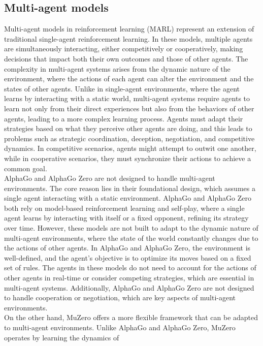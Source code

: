 \subsection*{Multi-agent models}
Multi-agent models in reinforcement learning (MARL) represent an extension of traditional single-agent reinforcement learning. 
In these models, multiple agents are simultaneously 
interacting, either competitively or cooperatively, making decisions 
that impact both their own outcomes and those of other agents. The complexity 
in multi-agent systems arises from the dynamic nature of the environment, 
where the actions of each agent can alter the environment and the states 
of other agents. Unlike in single-agent environments, where the agent 
learns by interacting with a static world, multi-agent systems require 
agents to learn not only from their direct experiences but also from the 
behaviors of other agents, leading to a more complex learning process. 
Agents must adapt their strategies based on what they perceive other agents 
are doing, and this leads to problems such as strategic coordination, 
deception, negotiation, and competitive dynamics. In competitive scenarios, 
agents might attempt to outwit one another, while in cooperative scenarios, 
they must synchronize their actions to achieve a common goal\cite{AD2}.\\
AlphaGo and AlphaGo Zero are not designed to handle 
multi-agent environments. The core reason lies in their foundational 
design, which assumes a single agent interacting with a static 
environment. AlphaGo and AlphaGo Zero both rely on model-based reinforcement 
learning and self-play, where a single agent learns by interacting 
with itself or a fixed opponent, refining its strategy over time. 
However, these models are not built to adapt to the dynamic nature of 
multi-agent environments, where the state of the world constantly 
changes due to the actions of other agents. In AlphaGo and AlphaGo Zero, 
the environment is well-defined, and the agent’s objective is to 
optimize its moves based on a fixed set of rules. The agents in these 
models do not need to account for the actions of other agents in 
real-time or consider competing strategies, which are essential in 
multi-agent systems. Additionally, AlphaGo and AlphaGo Zero are not 
designed to handle cooperation or negotiation, which are 
key aspects of multi-agent environments.\\
On the other hand, MuZero offers a more flexible
framework that can be adapted to multi-agent environments. Unlike 
AlphaGo and AlphaGo Zero, MuZero operates by learning the dynamics of 
